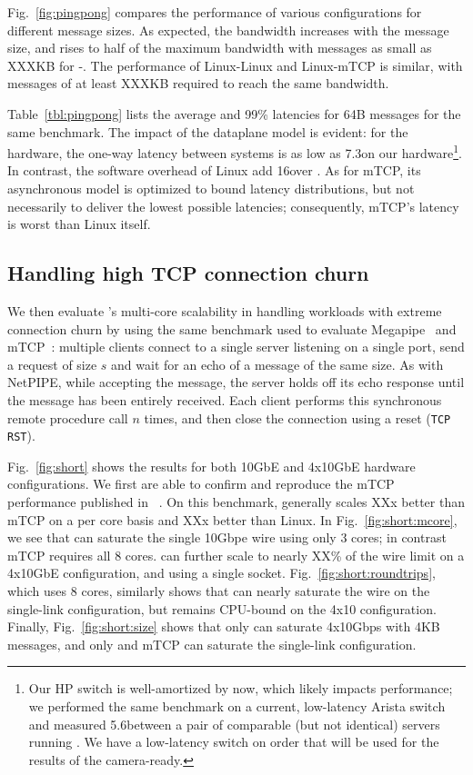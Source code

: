 Fig.~\ref{fig:pingpong} compares the performance of various
configurations for different message sizes.  As expected, the
bandwidth increases with the message size, and rises to half of the
maximum bandwidth with messages as small as XXXKB for \ix-\ix.  The performance of Linux-Linux and Linux-mTCP is similar, with messages of at least XXXKB required to reach the same bandwidth.


Table~\ref{tbl:pingpong} lists the average and 99\% latencies for 64B
messages for the same benchmark.  The impact of the \ix dataplane
model is evident: for the hardware, the one-way latency between \ix
systems is as low as 7.3\microsecond on our hardware\footnote{Our HP
  switch is well-amortized by now, which likely impacts
  performance; we performed the same benchmark on a current, low-latency Arista
  switch and measured 5.6\microsecond between a pair of comparable
  (but not identical) servers running \ix. We have a low-latency switch on order
  that will be used for the results of the camera-ready.}.  In
contrast, the software overhead of Linux add 16\microsecond over
\ix. As for mTCP, its asynchronous model is optimized to bound latency
distributions, but not necessarily to deliver the lowest possible
latencies; consequently, mTCP's latency is worst than Linux itself.



\subsection{Handling high TCP connection churn}
\label{sec:eval:short}



We then evaluate \ix's multi-core scalability in handling workloads
with extreme connection churn by using the same benchmark used to evaluate
Megapipe~\cite{han2012megapipe} and mTCP~\cite{jeong2014mtcp}:
multiple clients connect to a single server listening on a single
port, send a request of size $s$ and wait for an echo of a message of
the same size.  As with NetPIPE, while accepting the message, the server holds off its
echo response until the message has been entirely received.
Each client performs this synchronous remote procedure
call $n$ times, and then close the connection using a reset
(\texttt{TCP RST}).


 Fig.~\ref{fig:short} shows the results for both
10GbE and 4x10GbE hardware configurations.  We first
are able to confirm and reproduce the mTCP performance published in
~\cite{jeong2014mtcp}.  On this benchmark, \ix generally scales XXx
better than mTCP on a per core basis and XXx better than Linux.  In
Fig.~\ref{fig:short:mcore}, we see that \ix can saturate the single
10Gbpe wire using only 3 cores; in contrast mTCP requires all 8
cores. \ix can further scale to nearly XX\% of the wire limit on a
4x10GbE configuration, and using a single socket.
Fig.~\ref{fig:short:roundtrips}, which uses 8 cores, similarly shows
that \ix can nearly saturate the wire on the single-link
configuration, but remains CPU-bound on the 4x10 configuration.
Finally, Fig.~\ref{fig:short:size} shows that only \ix can saturate
4x10Gbps with 4KB messages, and only \ix and mTCP can saturate the
single-link configuration.


